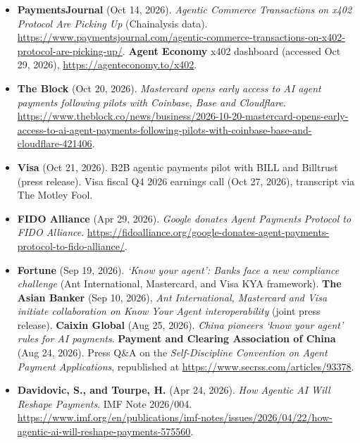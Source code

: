 \documentclass[11pt,letterpaper]{article}
\begin{document}
\begin{itemize}
  \item \textbf{PaymentsJournal} (Oct 14, 2026). \textit{Agentic Commerce Transactions on x402 Protocol Are Picking Up} (Chainalysis data). \url{https://www.paymentsjournal.com/agentic-commerce-transactions-on-x402-protocol-are-picking-up/}. \textbf{Agent Economy} x402 dashboard (accessed Oct 29, 2026), \url{https://agenteconomy.to/x402}.
  \item \textbf{The Block} (Oct 20, 2026). \textit{Mastercard opens early access to AI agent payments following pilots with Coinbase, Base and Cloudflare}. \url{https://www.theblock.co/news/business/2026-10-20-mastercard-opens-early-access-to-ai-agent-payments-following-pilots-with-coinbase-base-and-cloudflare-421406}.
  \item \textbf{Visa} (Oct 21, 2026). B2B agentic payments pilot with BILL and Billtrust (press release). Visa fiscal Q4 2026 earnings call (Oct 27, 2026), transcript via The Motley Fool.
  \item \textbf{FIDO Alliance} (Apr 29, 2026). \textit{Google donates Agent Payments Protocol to FIDO Alliance}. \url{https://fidoalliance.org/google-donates-agent-payments-protocol-to-fido-alliance/}.
  \item \textbf{Fortune} (Sep 19, 2026). \textit{`Know your agent': Banks face a new compliance challenge} (Ant International, Mastercard, and Visa KYA framework). \textbf{The Asian Banker} (Sep 10, 2026), \textit{Ant International, Mastercard and Visa initiate collaboration on Know Your Agent interoperability} (joint press release). \textbf{Caixin Global} (Aug 25, 2026). \textit{China pioneers `know your agent' rules for AI payments}. \textbf{Payment and Clearing Association of China} (Aug 24, 2026). Press Q\&A on the \textit{Self-Discipline Convention on Agent Payment Applications}, republished at \url{https://www.secrss.com/articles/93378}.
  \item \textbf{Davidovic, S., and Tourpe, H.} (Apr 24, 2026). \textit{How Agentic AI Will Reshape Payments}. IMF Note 2026/004. \url{https://www.imf.org/en/publications/imf-notes/issues/2026/04/22/how-agentic-ai-will-reshape-payments-575560}.
\end{itemize}
\end{document}
